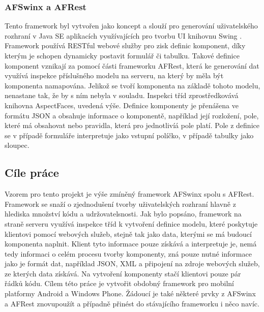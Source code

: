 \subsubsection{AFSwinx a AFRest}
Tento framework byl vytvořen jako koncept a slouží pro generování uživatelského rozhraní v Java SE aplikacích využívajících pro tvorbu UI knihovnu Swing \cite{tomasek-thesis}. Framework používá RESTful webové služby pro zisk definic komponent, díky kterým je schopen dynamicky postavit formulář či tabulku. Takové definice komponent vznikají za pomocí části frameworku AFRest, která ke generování dat využívá inspekce příslušného modelu na serveru, na který by měla být komponenta namapována. Jelikož se tvoří komponenta na základě tohoto modelu, nenastane tak, že by s ním nebyla v souladu. Inspekci tříd zprostředkovává knihovna AspectFaces, uvedená výše. Definice komponenty je přenášena ve formátu JSON a obsahuje informace o komponentě, například její rozložení, pole, které má obsahovat nebo pravidla, která pro jednotlivíá pole platí. Pole z definice se v případě formuláře interpretuje jako vstupní políčko, v případě tabulky jako sloupec. 

\subsection{Cíle práce}
Vzorem pro tento projekt je výše zmíněný framework AFSwinx spolu s AFRest\cite{tomasek-thesis}. Framework se snaží o zjednodušení tvorby uživatelských rozhraní hlavně z hlediska množství kódu a udržovatelsnosti. Jak bylo popsáno, framework na straně serveru využívá inspekce tříd k vytvoření definice modelu, které poskytuje klientovi pomocí webových služeb, stejně tak jako data, kterými se má budoucí komponenta naplnit. Klient tyto informace pouze získává a interpretuje je, nemá tedy informaci o celém procesu tvorby komponenty, zná pouze nutné informace jako je formát dat, například JSON, XML a připojení na zdroje webových služeb, ze kterých data získává. Na vytvoření komponenty stačí klientovi pouze pár řádků kódu. Cílem této práce je vytvořit obdobný framework pro mobilní platformy Android a Windows Phone. Žádoucí je také některé prvky z AFSwinx a AFRest znovupoužít a případně přinést do stávajícího frameworku i něco navíc.
